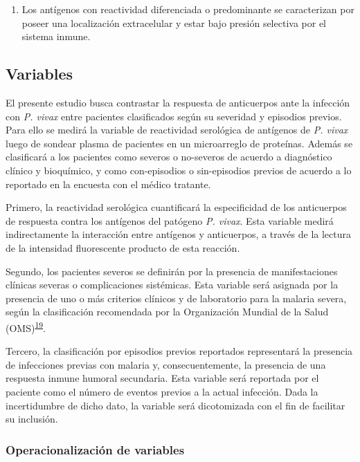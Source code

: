 \documentclass[a4paper]{article}
\providecommand{\tightlist}{%
  \setlength{\itemsep}{0pt}\setlength{\parskip}{0pt}}
\begin{document}
\begin{enumerate}
\def\labelenumi{\arabic{enumi}.}
\setcounter{enumi}{2}
\tightlist
\item
  Los antígenos con reactividad diferenciada o predominante se
  caracterizan por poseer una localización extracelular y estar bajo
  presión selectiva por el sistema inmune.
\end{enumerate}

\subsection{Variables}\label{variables}

El presente estudio busca contrastar la respuesta de anticuerpos ante la
infección con \emph{P. vivax} entre pacientes clasificados según su
severidad y episodios previos. Para ello se medirá la variable de
reactividad serológica de antígenos de \emph{P. vivax} luego de sondear
plasma de pacientes en un microarreglo de proteínas. Además se
clasificará a los pacientes como severos o no-severos de acuerdo a
diagnóstico clínico y bioquímico, y como con-episodios o sin-episodios
previos de acuerdo a lo reportado en la encuesta con el médico tratante.

Primero, la reactividad serológica cuantificará la especificidad de los
anticuerpos de respuesta contra los antígenos del patógeno \emph{P.
vivax}. Esta variable medirá indirectamente la interacción entre
antígenos y anticuerpos, a través de la lectura de la intensidad
fluorescente producto de esta reacción.

Segundo, los pacientes severos se definirán por la presencia de
manifestaciones clínicas severas o complicaciones sistémicas. Esta
variable será asignada por la presencia de uno o más criterios clínicos
y de laboratorio para la malaria severa, según la clasificación
recomendada por la Organización Mundial de la Salud
(OMS)\textsuperscript{\protect\hyperlink{ref-WHO2014severe}{19}}.

Tercero, la clasificación por episodios previos reportados representará
la presencia de infecciones previas con malaria y, consecuentemente, la
presencia de una respuesta inmune humoral secundaria. Esta variable será
reportada por el paciente como el número de eventos previos a la actual
infección. Dada la incertidumbre de dicho dato, la variable será
dicotomizada con el fin de facilitar su inclusión.

\subsubsection{Operacionalización de
variables}\label{operacionalizacion-de-variables}
\end{document}
